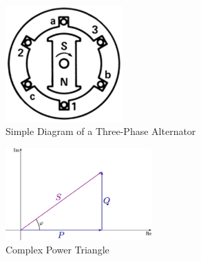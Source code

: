 \documentclass[12pt]{article}
\begin{document}
\begin{figure}[p]
	\centering
	\includegraphics[width=0.4\textwidth]{img/threephasemotor}
	\caption{Simple Diagram of a Three-Phase Alternator}
	\label{alternator}
\end{figure}

\begin{figure}[p]
	\centering
	\includegraphics[width=0.5\textwidth]{img/complexpwr}
	\caption{Complex Power Triangle}
	\label{complexpwr}
\end{figure}
\end{document}
